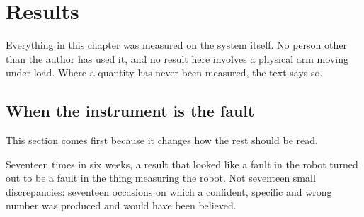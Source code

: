 \chapter{Results}
\label{ch:results}

Everything in this chapter was measured on the system itself. No person other
than the author has used it, and no result here involves a physical arm moving
under load. Where a quantity has never been measured, the text says so.

\section{When the instrument is the fault}
\label{sec:instruments}

This section comes first because it changes how the rest should be read.

Seventeen times in six weeks, a result that looked like a fault in the robot
turned out to be a fault in the thing measuring the robot. Not seventeen small
discrepancies: seventeen occasions on which a confident, specific and wrong
number was produced and would have been believed.

